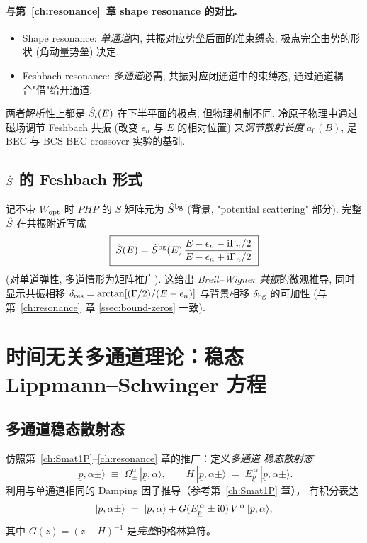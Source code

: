 \paragraph{与第~\ref{ch:resonance}~章 shape resonance 的对比.}\quad
\begin{itemize}
  \item Shape resonance: \emph{单通道}内, 共振对应势垒后面的准束缚态; 极点完全由势的形状 (角动量势垒) 决定.
  \item Feshbach resonance: \emph{多通道}必需, 共振对应闭通道中的束缚态, 通过通道耦合"借"给开通道.
\end{itemize}
两者解析性上都是 $\hat{S}_l(E)$ 在下半平面的极点, 但物理机制不同. 冷原子物理中通过磁场调节 Feshbach 共振 (改变 $\epsilon_n$ 与 $E$ 的相对位置) 来\emph{调节散射长度} $a_0(B)$, 是 BEC 与 BCS-BEC crossover 实验的基础.

\subsection{$\hat{S}$ 的 Feshbach 形式}\label{sec:multich-Smat-Feshbach}

记不带 $W_{\rm opt}$ 时 $PHP$ 的 $S$ 矩阵元为 $\hat{S}^{\rm bg}$ (背景, "potential scattering" 部分). 完整 $\hat{S}$ 在共振附近写成
\begin{equation}
  \boxed{\;\hat{S}(E)=\hat{S}^{\rm bg}(E)\,\frac{E-\epsilon_n-\mathrm{i}\Gamma_n/2}{E-\epsilon_n+\mathrm{i}\Gamma_n/2}\;}
  \label{eq:multich-Smat-Feshbach}
\end{equation}
(对单道弹性, 多道情形为矩阵推广). 这给出 \emph{Breit--Wigner 共振}的微观推导, 同时显示共振相移 $\delta_{\rm res}=\arctan[(\Gamma/2)/(E-\epsilon_n)]$ 与背景相移 $\delta_{\rm bg}$ 的可加性 (与第~\ref{ch:resonance}~章 \eqref{ssec:bound-zeros} 一致).

\section{时间无关多通道理论：稳态 Lippmann–Schwinger 方程}
\label{sec:multich-LS}

\subsection{多通道稳态散射态}

仿照第~\ref{ch:Smat1P}--\ref{ch:resonance} 章的推广：定义\emph{多通道
稳态散射态}
\begin{equation}
  |\underline{p},\alpha\pm\rangle \;\equiv\; \Omega_\pm^\alpha\,|\underline{p},\alpha\rangle ,
  \qquad
  H\,|\underline{p},\alpha\pm\rangle \;=\; E_{\underline{p}}^{\,\alpha}\,|\underline{p},\alpha\pm\rangle .
\end{equation}
利用与单通道相同的 Damping 因子推导（参考第~\ref{ch:Smat1P} 章），
有积分表达
\begin{equation}
  |\underline{p},\alpha\pm\rangle
  \;=\; |\underline{p},\alpha\rangle
   + G(E_{\underline{p}}^{\,\alpha}\pm\mathrm{i} 0)\,V^{\,\alpha}\,
        |\underline{p},\alpha\rangle ,
\end{equation}
其中 $G(z)=(z-H)^{-1}$ 是\emph{完整}的格林算符。


